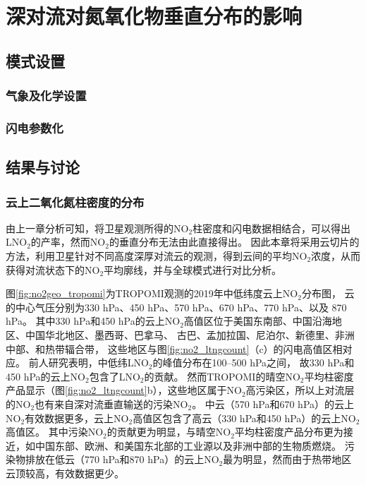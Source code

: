 
\chapter{深对流对氮氧化物垂直分布的影响}

\section{模式设置}

\subsection{气象及化学设置}

\subsection{闪电参数化}



\section{结果与讨论}

\subsection{云上二氧化氮柱密度的分布}

由上一章分析可知，将卫星观测所得的NO$_2$柱密度和闪电数据相结合，可以得出LNO$_2$的产率，然而NO$_2$的垂直分布无法由此直接得出。
因此本章将采用云切片的方法，利用卫星针对不同高度深厚对流云的观测，得到云间的平均NO$_2$浓度，从而获得对流状态下的NO$_2$平均廓线，并与全球模式进行对比分析。

图\ref{fig:no2geo_tropomi}为TROPOMI观测的2019年中低纬度云上NO$_2$分布图，
云的中心气压分别为330 hPa、450 hPa、570 hPa、670 hPa、770 hPa、以及 870 hPa。
其中330 hPa和450 hPa的云上NO$_2$高值区位于美国东南部、中国沿海地区、中国华北地区、墨西哥、巴拿马、
古巴、孟加拉国、尼泊尔、新德里、非洲中部、和热带辐合带，
这些地区与图\ref{fig:no2_ltngcount}（c）的闪电高值区相对应。
前人研究表明，中低纬LNO$_2$的峰值分布在100--500 hPa之间\citep{Pickering.1988,Ott.2010,Luo.2017}，
故330 hPa和450 hPa的云上NO$_2$包含了LNO$_2$的贡献。
然而TROPOMI的晴空NO$_2$平均柱密度产品显示（图\ref{fig:no2_ltngcount}b），这些地区属于NO$_2$高污染区，所以上对流层的NO$_2$也有来自深对流垂直输送的污染NO$_2$。
中云（570 hPa和670 hPa）的云上NO$_2$有效数据更多，云上NO$_2$高值区包含了高云（330 hPa和450 hPa）的云上NO$_2$高值区。
其中污染NO$_2$的贡献更为明显，与晴空NO$_2$平均柱密度产品分布更为接近，如中国东部、欧洲、和美国东北部的工业源以及非洲中部的生物质燃烧。
污染物排放在低云（770 hPa和870 hPa）的云上NO$_2$最为明显，然而由于热带地区云顶较高，有效数据更少。


